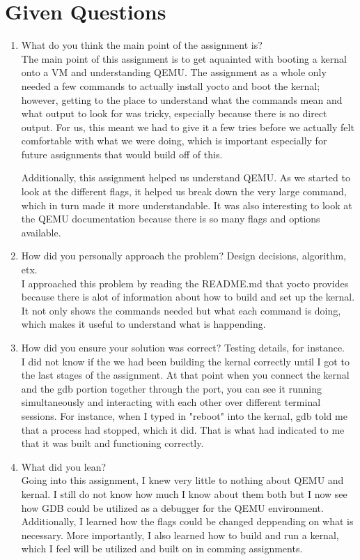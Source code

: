 \documentclass[10pt, onecolumn, letterpaper, draftclsnofoot]{IEEEtran}
\begin{document}
\section{Given Questions}
\begin{enumerate}
\item{What do you think the main point of the assignment is?} \\
The main point of this assignment is to get aquainted with booting a kernal onto a VM
and understanding QEMU. The assignment as a whole only needed a few commands to 
actually install yocto and boot the kernal; however, getting to the place to 
understand what the commands mean and what output to look for was tricky, especially 
because there is no direct output. For us, this meant we had to give it a few tries 
before we actually felt comfortable with what we were doing, which is important 
especially for future assignments that would build off of this. \par
Additionally, this assignment helped us understand QEMU. As we started to look at the 
different flags, it helped us break down the very large command, which in turn made 
it more understandable. It was also interesting to look at the QEMU documentation 
because there is so many flags and options available. \par
\item{How did you personally approach the problem? Design decisions, algorithm, etx.} \\
I approached this problem by reading the README.md that yocto provides because there is alot of information about how to build and set up the kernal. It not only shows the 
commands needed but what each command is doing, which makes it useful to understand 
what is happending. \par
\item{How did you ensure your solution was correct? Testing details, for instance.} \\
I did not know if the we had been building the kernal correctly until I got to the last
stages of the assignment. At that point when you connect the kernal and the gdb portion 
together through the port, you can see it running simultaneously and interacting with 
each other over different terminal sessions. For instance, when I typed in "reboot" 
into the kernal, gdb told me that a process had stopped, which it did. That is what 
had indicated to me that it was built and functioning correctly. \par
\item{What did you lean?} \\
Going into this assignment, I knew very little to nothing about QEMU and kernal. I 
still do not know how much I know about them both but I now see how GDB could be 
utilized as a debugger for the QEMU environment. Additionally, I learned how the 
flags could be changed deppending on what is necessary. More importantly, I also
learned how to build and run a kernal, which I feel will be utilized and built on in 
comming assignments. \par
\end{enumerate}
\end{document}
